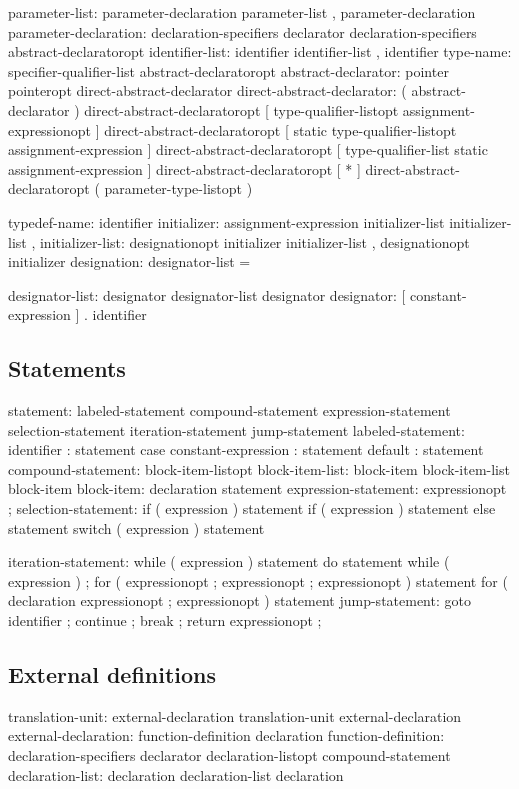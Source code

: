 \begin{code_files}
parameter-list:
	parameter-declaration
	parameter-list , parameter-declaration
parameter-declaration:
	declaration-specifiers declarator
	declaration-specifiers abstract-declaratoropt
identifier-list:
	identifier
	identifier-list , identifier
type-name:
	specifier-qualifier-list abstract-declaratoropt
abstract-declarator:
	pointer
	pointeropt direct-abstract-declarator
direct-abstract-declarator:
	( abstract-declarator )
	direct-abstract-declaratoropt [ type-qualifier-listopt
	assignment-expressionopt ]
	direct-abstract-declaratoropt [ static type-qualifier-listopt
	assignment-expression ]
	direct-abstract-declaratoropt [ type-qualifier-list static
	assignment-expression ]
	direct-abstract-declaratoropt [ * ]
	direct-abstract-declaratoropt ( parameter-type-listopt )

typedef-name:
	identifier
initializer:
	assignment-expression
	{ initializer-list }
	{ initializer-list , }
initializer-list:
	designationopt initializer
	initializer-list , designationopt initializer
designation:
	designator-list =

designator-list:
	designator
	designator-list designator
designator:
	[ constant-expression ]
	. identifier
\end{code_files}

\subsection{Statements}
\begin{code_files}
statement:
	labeled-statement
	compound-statement
	expression-statement
	selection-statement
	iteration-statement
	jump-statement
labeled-statement:
	identifier : statement
	case constant-expression : statement
	default : statement
compound-statement:
	{ block-item-listopt }
block-item-list:
	block-item
	block-item-list block-item
block-item:
	declaration
	statement
expression-statement:
	expressionopt ;
selection-statement:
	if ( expression ) statement
	if ( expression ) statement else statement
	switch ( expression ) statement

iteration-statement:
	while ( expression ) statement
	do statement while ( expression ) ;
	for ( expressionopt ; expressionopt ; expressionopt ) statement
	for ( declaration expressionopt ; expressionopt ) statement
jump-statement:
	goto identifier ;
	continue ;
	break ;
	return expressionopt ;
\end{code_files}

\subsection{External definitions}\label{chap:extdefin}
\begin{code_files}
translation-unit:
	external-declaration
	translation-unit external-declaration
external-declaration:
	function-definition
	declaration
function-definition:
	declaration-specifiers declarator declaration-listopt compound-statement
declaration-list:
	declaration
	declaration-list declaration
\end{code_files}

